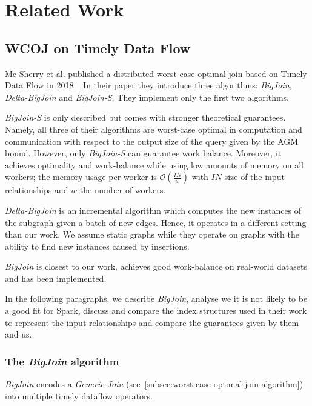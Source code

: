 \section{Related Work} \label{sec:related-work}




\subsection{\textsc{WCOJ} on Timely Data Flow}\label{subsec:wcoj-timely-data-flow}

Mc Sherry et al. published a distributed worst-case optimal join based on Timely Data Flow in 2018~\cite{ammar2018distributed,naiad}.
In their paper they introduce three algorithms: \textit{BigJoin}, \textit{Delta-BigJoin} and \textit{BigJoin-S}.
They implement only the first two algorithms.

\textit{BigJoin-S} is only described but comes with stronger theoretical guarantees.
Namely, all three of their algorithms are worst-case optimal in computation and communication with respect to the output size of the query
given by the AGM bound.
However, only \textit{BigJoin-S} can guarantee work balance.
Moreover, it achieves optimality and work-balance while using low amounts of memory on all workers;
the memory usage per worker is $\mathcal{O} (\frac{IN}{w})$ with $IN$ size of the input relationships and $w$ the number of workers.

\textit{Delta-BigJoin} is an incremental algorithm which computes the new instances of the subgraph given a batch of new edges.
Hence, it operates in a different setting than our work.
We assume static graphs while they operate on graphs with the ability to find new instances caused by insertions.

\textit{BigJoin} is closest to our work, achieves good work-balance on real-world datasets and has been implemented.

In the following paragraphs, we describe \textit{BigJoin}, analyse we it is not likely to be a good fit for Spark,
discuss and compare the index structures used in their work to represent the input relationships and compare the
guarantees given by them and us.

\subsubsection{The \textit{BigJoin} algorithm}
\textit{BigJoin} encodes a \textit{Generic Join} (see~\cref{subsec:worst-case-optimal-join-algorithm}) into multiple
timely dataflow operators.

